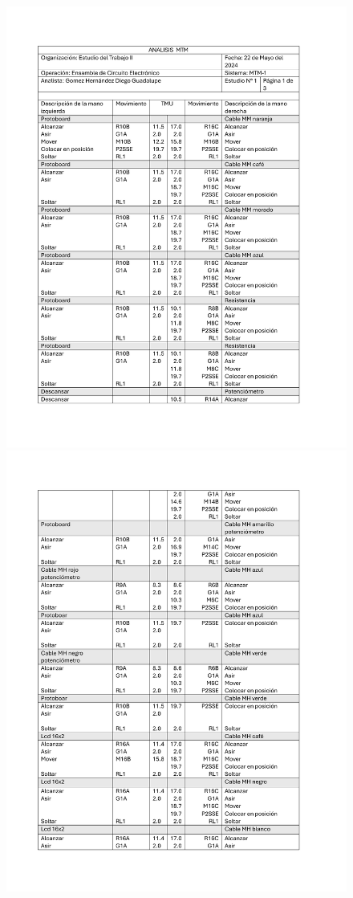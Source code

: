     \begin{figure}[H]
        \centering
        \includegraphics[scale=0.21]{13/img/analisMtmUno.pdf}
        \centering
        \includegraphics[scale=0.21]{13/img/analisMtmDos.pdf}

\end{figure}
